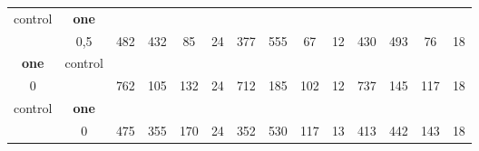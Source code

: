 \begin{table}[H]
{\begin{tabular}{|c|c|c|c|c|c|c|c|c|c|c|c|c|c|}
control & \cellcolor{blue!15}\textbf{one}& {\color[HTML]{00009B} } & {\color[HTML]{9A0000} } & {\color[HTML]{009901} } &  & {\color[HTML]{00009B} } & {\color[HTML]{9A0000} } & {\color[HTML]{009901} } &  & {\color[HTML]{00009B} } & {\color[HTML]{9A0000} } & {\color[HTML]{009901} } &  \\ 
 & \cellcolor{ blue!15}0,5 & \multirow{-2}{*}{{\color[HTML]{00009B} 482}} & \multirow{-2}{*}{{\color[HTML]{9A0000} 432}} & \multirow{-2}{*}{{\color[HTML]{009901} 85}} & \multirow{-2}{*}{24} & \multirow{-2}{*}{{\color[HTML]{00009B} 377}} & \multirow{-2}{*}{{\color[HTML]{9A0000} 555}} & \multirow{-2}{*}{{\color[HTML]{009901} 67}} & \multirow{-2}{*}{12} & \multirow{-2}{*}{{\color[HTML]{00009B} 430}} & \multirow{-2}{*}{{\color[HTML]{9A0000} 493}} & \multirow{-2}{*}{{\color[HTML]{009901} 76}} & \multirow{-2}{*}{18} \\ \hline

\cellcolor{blue!15}\textbf{one} & control& {\color[HTML]{00009B} } & {\color[HTML]{9A0000} } & {\color[HTML]{009901} } &  & {\color[HTML]{00009B} } & {\color[HTML]{9A0000} } & {\color[HTML]{009901} } &  & {\color[HTML]{00009B} } & {\color[HTML]{9A0000} } & {\color[HTML]{009901} } &  \\ 
\cellcolor{ blue!15}0 &  & \multirow{-2}{*}{{\color[HTML]{00009B} 762}} & \multirow{-2}{*}{{\color[HTML]{9A0000} 105}} & \multirow{-2}{*}{{\color[HTML]{009901} 132}} & \multirow{-2}{*}{24} & \multirow{-2}{*}{{\color[HTML]{00009B} 712}} & \multirow{-2}{*}{{\color[HTML]{9A0000} 185}} & \multirow{-2}{*}{{\color[HTML]{009901} 102}} & \multirow{-2}{*}{12} & \multirow{-2}{*}{{\color[HTML]{00009B} 737}} & \multirow{-2}{*}{{\color[HTML]{9A0000} 145}} & \multirow{-2}{*}{{\color[HTML]{009901} 117}} & \multirow{-2}{*}{18} \\ \hline

control & \cellcolor{blue!15}\textbf{one}& {\color[HTML]{00009B} } & {\color[HTML]{9A0000} } & {\color[HTML]{009901} } &  & {\color[HTML]{00009B} } & {\color[HTML]{9A0000} } & {\color[HTML]{009901} } &  & {\color[HTML]{00009B} } & {\color[HTML]{9A0000} } & {\color[HTML]{009901} } &  \\ 
 & \cellcolor{ blue!15}0 & \multirow{-2}{*}{{\color[HTML]{00009B} 475}} & \multirow{-2}{*}{{\color[HTML]{9A0000} 355}} & \multirow{-2}{*}{{\color[HTML]{009901} 170}} & \multirow{-2}{*}{24} & \multirow{-2}{*}{{\color[HTML]{00009B} 352}} & \multirow{-2}{*}{{\color[HTML]{9A0000} 530}} & \multirow{-2}{*}{{\color[HTML]{009901} 117}} & \multirow{-2}{*}{13} & \multirow{-2}{*}{{\color[HTML]{00009B} 413}} & \multirow{-2}{*}{{\color[HTML]{9A0000} 442}} & \multirow{-2}{*}{{\color[HTML]{009901} 143}} & \multirow{-2}{*}{18} \\ \hline


\end{tabular}}
\end{table}
